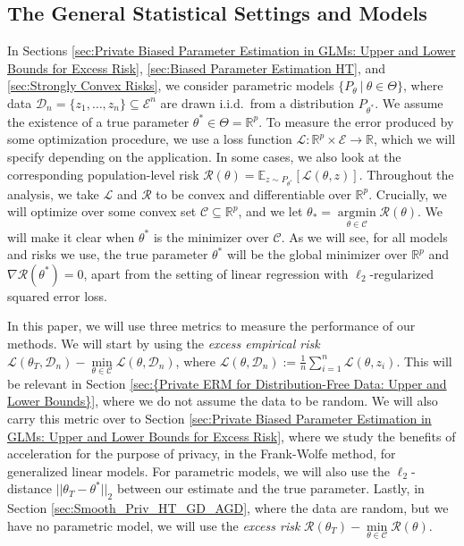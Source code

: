 \documentclass{article}
\begin{document}

\subsection{The General Statistical Settings and Models} \label{sec:The General Statistical Settings and Models}

In Sections \ref{sec:Private Biased Parameter Estimation in GLMs: Upper and Lower Bounds for Excess Risk}, \ref{sec:Biased Parameter Estimation HT}, and \ref{sec:Strongly Convex Risks}, we consider parametric models $\{P_{\theta} \ | \ \theta \in \Theta\}$, where data $\mathcal{D}_n = \{z_1, \dots, z_n \} \subseteq \mathcal{E}^n$ are drawn i.i.d.\ from a distribution $P_{\theta^*}$. We assume the existence of a true parameter $\theta^* \in \Theta =  \mathbb{R}^p$. To measure the error produced by some optimization procedure, we use a loss function $\mathcal{L}: \mathbb{R}^p \times \mathcal{E} \rightarrow \mathbb{R}$, which we will specify depending on the application. In some cases, we also look at the corresponding population-level risk $\mathcal{R(\theta)} = \mathbb{E}_{z \sim P_{\theta^*}}[\mathcal{L}(\theta, z)]$. Throughout the analysis, we take $\mathcal{L}$ and $\mathcal{R}$ to be convex and differentiable over $\mathbb{R}^p$. Crucially, we will optimize over some convex set $\mathcal{C} \subseteq \mathbb{R}^p$, and we let $\theta_{*} = \mathop{\arg\min}\limits_{\theta \in \mathcal{C}}\mathcal{R}(\theta)$. We will make it clear when $\theta^*$ is the minimizer over $\mathcal{C}$. As we will see, for all models and risks we use, the true parameter $\theta^*$ will be the global minimizer over $\mathbb{R}^p$ and $\nabla\mathcal{R}(\theta^*) = 0$, apart from the setting of linear regression with $\ell_2$-regularized squared error loss.

In this paper, we will use three metrics to measure the performance of our methods. We will start by using the \emph{excess empirical risk} $\mathcal{L}(\theta_T, \mathcal{D}_n) - \mathop{\min}\limits_{\theta \in \mathcal{C}}\mathcal{L}(\theta, \mathcal{D}_n)$, where $\mathcal{L}(\theta, \mathcal{D}_n) := \frac{1}{n}\sum_{i = 1}^n\mathcal{L}(\theta, z_i)$. This will be relevant in Section \ref{sec:{Private ERM for Distribution-Free Data: Upper and Lower Bounds}}, where we do not assume the data to be random. We will also carry this metric over to Section \ref{sec:Private Biased Parameter Estimation in GLMs: Upper and Lower Bounds for Excess Risk}, where we study the benefits of acceleration for the purpose of privacy, in the Frank-Wolfe method, for generalized linear models. For parametric models, we will also use the $\ell_2$-distance $||\theta_T - \theta^*||_2$ between our estimate and the true parameter. Lastly, in Section \ref{sec:Smooth_Priv_HT_GD_AGD}, where the data are random, but we have no parametric model, we will use the \emph{excess risk} $\mathcal{R}(\theta_T) - \mathop{\min}\limits_{\theta \in \mathcal{C}}\mathcal{R}(\theta)$.
\end{document}
